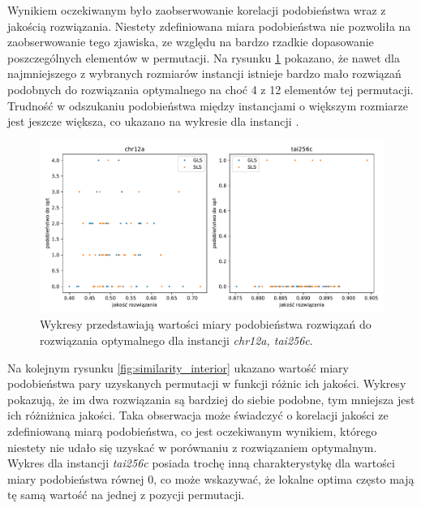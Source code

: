 \documentclass{article}
\begin{document}
Wynikiem oczekiwanym było zaobserwowanie korelacji podobieństwa wraz z jakością rozwiązania. Niestety zdefiniowana miara podobieństwa nie pozwoliła na zaobserwowanie tego zjawiska, ze względu na bardzo rzadkie dopasowanie poszczególnych elementów w permutacji. Na rysunku \ref{fig:similarity_opt} pokazano, że nawet dla najmniejszego z wybranych rozmiarów instancji istnieje bardzo mało rozwiązań podobnych do rozwiązania optymalnego na choć 4 z 12 elementów tej permutacji. Trudność w odszukaniu podobieństwa między instancjami o większym rozmiarze jest jeszcze większa, co ukazano na wykresie dla instancji .
\begin{figure}[H]
	\centering
	\includegraphics[width=\linewidth]{figs/quality_best_numit_vs_similarity_opt.pdf}
	\caption{Wykresy przedstawiają wartości miary podobieństwa rozwiązań do rozwiązania optymalnego dla instancji \textit{chr12a, tai256c}.}
	\label{fig:similarity_opt}
\end{figure}

Na kolejnym rysunku \ref{fig:similarity_interior} ukazano wartość miary podobieństwa pary uzyskanych permutacji w funkcji różnic ich jakości. Wykresy pokazują, że im dwa rozwiązania są bardziej do siebie podobne, tym mniejsza jest ich różniżnica jakości. Taka obserwacja może świadczyć o korelacji jakości ze zdefiniowaną miarą podobieństwa, co jest oczekiwanym wynikiem, którego niestety nie udało się uzyskać w porównaniu z rozwiązaniem optymalnym. Wykres dla instancji \textit{tai256c} posiada trochę inną charakterystykę dla wartości miary podobieństwa równej 0, co może wskazywać, że lokalne optima często mają tę samą wartość na jednej z pozycji permutacji.
\end{document}
